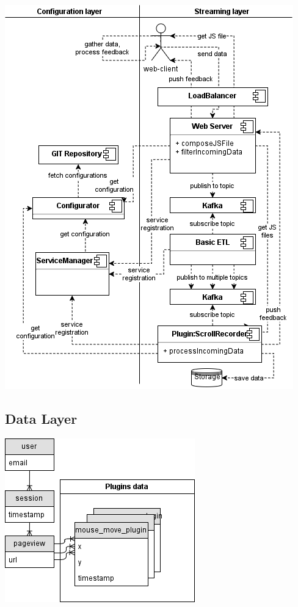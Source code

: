 \documentclass[landscape]{a0poster}
\begin{document}
\begin{multicols}{3}
\begin{center}
\includegraphics[width=0.90\columnwidth]{diagram-architecture-interaction}
\color{MainColor}
\end{center}\vspace{1cm}

 
\color{MainColor} 
\subsection*{Data Layer}
\color{black}

\begin{center}
\includegraphics[width=0.4\columnwidth]{base-data-structure}
\color{MainColor}
\end{center}\vspace{1cm}



\end{multicols}
\end{document}
